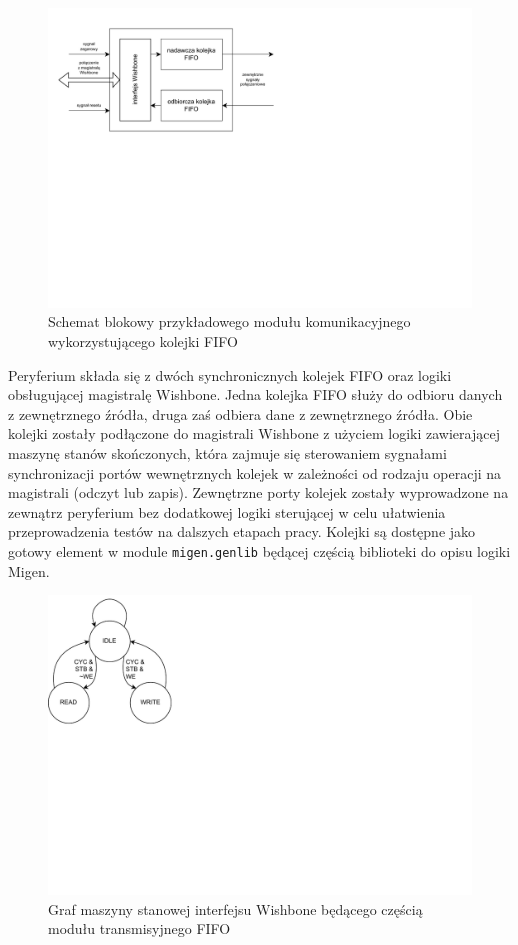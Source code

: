 \begin{figure}[H]
    \centering
    \includegraphics[scale=1,trim={0.5cm 8.5cm 9.5cm 1cm},clip]{implementation/fifo-peripheral-diag.pdf}
    \caption{Schemat blokowy przykładowego modułu komunikacyjnego wykorzystującego kolejki FIFO}
    \label{fig:fifo-peripheral-diag}
\end{figure}

Peryferium składa się z dwóch synchronicznych kolejek FIFO oraz logiki obsługującej magistralę Wishbone. Jedna kolejka FIFO służy do odbioru danych z zewnętrznego źródła, druga zaś odbiera dane z zewnętrznego źródła. Obie kolejki zostały podłączone do magistrali Wishbone z użyciem logiki zawierającej maszynę stanów skończonych, która zajmuje się sterowaniem sygnałami synchronizacji portów wewnętrznych kolejek w zależności od rodzaju operacji na magistrali (odczyt lub zapis). Zewnętrzne porty kolejek zostały wyprowadzone na zewnątrz peryferium bez dodatkowej logiki sterującej w celu ułatwienia przeprowadzenia testów na dalszych etapach pracy. Kolejki są dostępne jako gotowy element w module \texttt{migen.genlib} będącej częścią biblioteki do opisu logiki Migen.

\begin{figure}[H]
    \centering
    \includegraphics[scale=1,trim={0 8.5cm 14.8cm 0.1cm},clip]{implementation/fifo-fsm-orig.pdf}
    \caption{Graf maszyny stanowej interfejsu Wishbone będącego częścią modułu transmisyjnego FIFO}
    \label{fig:fifo-fsm-orig}
\end{figure}

